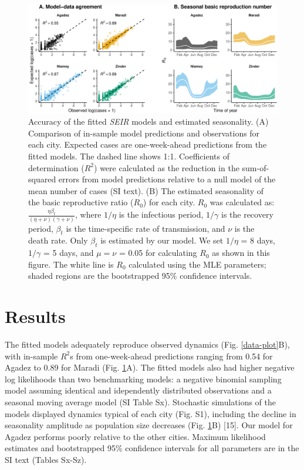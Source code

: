 \documentclass[3p]{elsarticle} %
\makeatletter
\def\maxwidth{\ifdim\Gin@nat@width>\linewidth\linewidth
\else\Gin@nat@width\fi}
\let\Oldincludegraphics\includegraphics
\renewcommand{\includegraphics}[1]{\Oldincludegraphics[width=\maxwidth]{#1}}
\makeatother
\begin{document}
\begin{figure}
\centering
\includegraphics{measles-ews-manuscript_files/figure-latex/scatters-r0-1.pdf}
\caption{Accuracy of the fitted \emph{SEIR} models and estimated
seasonality. (A) Comparison of in-sample model predictions and
observations for each city. Expected cases are one-week-ahead
predictions from the fitted models. The dashed line shows 1:1.
Coefficients of determination (\(R^2\)) were calculated as the reduction
in the sum-of-squared errors from model predictions relative to a null
model of the mean number of cases (SI text). (B) The estimated
seasonality of the basic reproductive ratio (\(R_0\)) for each city.
\(R_0\) was calculated as:
\(\frac{\eta \beta_t}{(\eta+\nu)(\gamma+\nu)}\), where \(1/\eta\) is the
infectious period, \(1/\gamma\) is the recovery period, \(\beta_t\) is
the time-specific rate of transmission, and \(\nu\) is the death rate.
Only \(\beta_t\) is estimated by our model. We set \(1/\eta\) = 8 days,
\(1/\gamma\) = 5 days, and \(\mu = \nu\) = 0.05 for calculating \(R_0\)
as shown in this figure. The white line is \(R_0\) calculated using the
MLE parameters; shaded regions are the bootstrapped 95\% confidence
intervals. \label{scatters}}
\end{figure}

\hypertarget{results}{%
\section{Results}\label{results}}

The fitted models adequately reproduce observed dynamics (Fig.
\ref{data-plot}B), with in-sample \(R^2\)s from one-week-ahead
predictions ranging from 0.54 for Agadez to 0.89 for Maradi (Fig.
\ref{scatters}A). The fitted models also had higher negative log
likelihoods than two benchmarking models: a negative binomial sampling
model assuming identical and idependently distributed observations and a
seasonal moving average model (SI Table Sx). Stochastic simulations of
the models displayed dynamics typical of each city (Fig. S1), including
the decline in seasonality amplitude as population size decreases (Fig.
\ref{scatters}B) {[}15{]}. Our model for Agadez performs poorly relative
to the other cities. Maximum likelihood estimates and bootstrapped 95\%
confidence intervals for all parameters are in the SI text (Tables
Sx-Sz).
\end{document}
